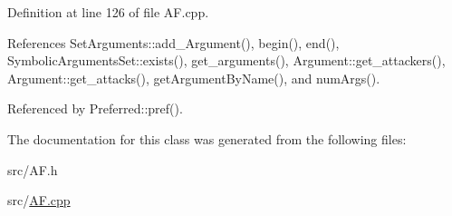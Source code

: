 Definition at line 126 of file A\-F.\-cpp.



References Set\-Arguments\-::add\-\_\-\-Argument(), begin(), end(), Symbolic\-Arguments\-Set\-::exists(), get\-\_\-arguments(), Argument\-::get\-\_\-attackers(), Argument\-::get\-\_\-attacks(), get\-Argument\-By\-Name(), and num\-Args().



Referenced by Preferred\-::pref().



The documentation for this class was generated from the following files\-:\begin{DoxyCompactItemize}
\item 
src/A\-F.\-h\item 
src/\hyperlink{AF_8cpp}{A\-F.\-cpp}\end{DoxyCompactItemize}
